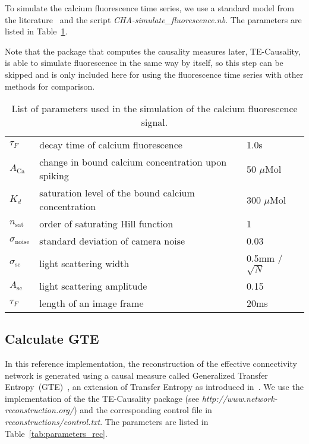 \documentclass[a4paper,11pt]{article}
\begin{document}
To simulate the calcium fluorescence time series, we use a standard model from the literature~\cite{Vogelstein:2009p3029,Mishchencko:2009p4301} and the script \emph{CHA-simulate\_fluorescence.nb}.
The parameters are listed in Table~\ref{tab:parameters_fluoro}.

Note that the package that computes the causality measures later, TE-Causality, is able to simulate fluorescence in the same way by itself, so this step can be skipped and is only included here for using the fluorescence time series with other methods for comparison.

\begin{table}[ht]
  \begin{center}
    \begin{tabular}
      {|ll|l|} %
      \hline
      $\tau_F$ & decay time of calcium fluorescence & 1.0s \\
      $A_{\text{Ca}}$ & change in bound calcium concentration upon spiking & 50 $\mu$Mol \\
      $K_d$ & saturation level of the bound calcium concentration & 300 $\mu$Mol \\
      $n_{\text{sat}}$ & order of saturating Hill function & 1 \\
      $\sigma_{\text{noise}}$ & standard deviation of camera noise & 0.03 \\
      $\sigma_{\text{sc}}$ & light scattering width & 0.5mm / $\sqrt{N}$ \\
      $A_{\text{sc}}$ & light scattering amplitude & 0.15 \\
      $\tau_F$ & length of an image frame & 20ms \\
      \hline
    \end{tabular}
  \end{center}
  \caption{List of parameters used in the simulation of the calcium fluorescence signal.}
  \label{tab:parameters_fluoro}
\end{table}


\subsection{Calculate GTE}

In this reference implementation, the reconstruction of the effective connectivity network is generated using a causal measure called Generalized Transfer Entropy~(GTE)~\cite{Stetter:2012vt,Orlandi:2013uz}, an extension of Transfer Entropy as introduced in~\cite{Schreiber:2000p79}.
We use the implementation of the the TE-Causality package (see \emph{http://www.network-reconstruction.org/}) and the corresponding control file in \emph{reconstructions/control.txt}.
The parameters are listed in Table~\ref{tab:parameters_rec}.
\end{document}
